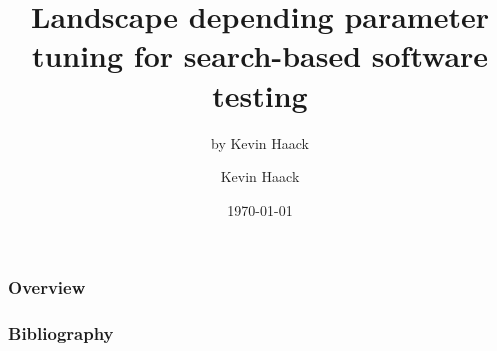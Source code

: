 \documentclass[aspectratio=169]{beamer}
\title{Landscape depending parameter
tuning for search-based software testing}
\subtitle{by Kevin Haack}
\author{Kevin Haack}
\institute{Software Engineering}
\date{\today}
\begin{document}
	
{
	\hnititlebackground 
	\begin{frame}
		\titlepage
	\end{frame}
}

{
	\begin{frame}
		\frametitle{Overview}
		\tableofcontents
	\end{frame}
}





{
	\begin{frame}[allowframebreaks]
		\frametitle{Bibliography}
		
		
	\end{frame}
}


{
	\hnifullbackground 
	
	\begin{frame}
		\textbf{\Huge{\centerline{}}}
	\end{frame}
}
\end{document}
